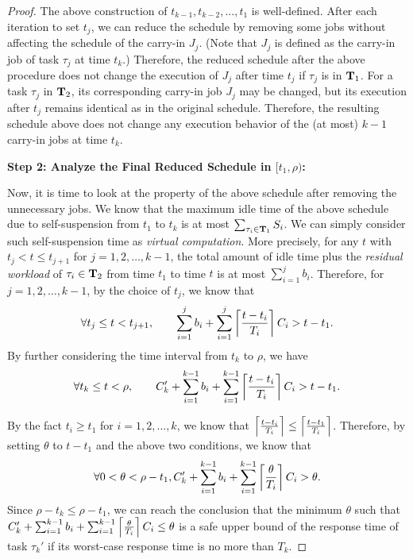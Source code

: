 \begin{proof}
The above construction of $t_{k-1}, t_{k-2}, \ldots, t_1$ is well-defined. After each iteration to set $t_j$, we can reduce the schedule by removing some jobs without affecting the schedule of the carry-in $J_j$. (Note that $J_j$ is defined as the carry-in job of task $\tau_j$ at time $t_k$.) Therefore, the reduced schedule after the above procedure does not change the execution of $J_j$ after time $t_j$ if $\tau_j$ is in ${\bf T}_1$. For a task $\tau_j$ in ${\bf T}_2$, its corresponding carry-in job $J_j$ may be changed, but its execution after $t_j$ remains identical as in the original schedule. 
Therefore, the resulting schedule above does not change any execution behavior of the (at most) $k-1$ carry-in jobs at time $t_k$.

{\bf Step 2: Analyze the Final Reduced Schedule in $[t_1, \rho)$:}


Now, it is time to look at the property of the above schedule after removing the unnecessary jobs. We know that the maximum idle time of the above schedule due to self-suspension from $t_1$ to $t_k$ is at most $\sum_{\tau_i \in {\bf T}_1} S_i$.  We can simply consider such self-suspension time as \emph{virtual computation}.  More precisely, for any $t$ with  $t_j < t \leq t_{j+1}$ for $j=1,2,\ldots,k-1$, the total amount of idle time plus the \emph{residual workload} of $\tau_i \in {\bf T}_2$ from time $t_1$ to time $t$ is at most $\sum_{i=1}^{j} b_i$. 
Therefore, for $j=1,2,\ldots,k-1$, by the choice of $t_j$, we know that
\[
\forall t_j \leq t < t_{j+1},\qquad  \sum_{i=1}^{j} b_i + \sum_{i=1}^j \left\lceil{\frac{t- t_i}{T_i} }\right\rceil C_i >  t-t_1.
\]
By further considering the time interval from $t_k$ to $\rho$, we have
\[
\forall t_k \leq t < \rho,\qquad  C_k'+\sum_{i=1}^{k-1} b_i + \sum_{i=1}^{k-1} \left\lceil{\frac{t- t_i}{T_i} }\right\rceil C_i > t-t_1.
\]

By the fact $t_i \geq t_1$ for $i=1,2,\ldots,k$, we know that $\left\lceil{\frac{t- t_i}{T_i} }\right\rceil \leq \left\lceil{\frac{t- t_1}{T_i} }\right\rceil$. Therefore, by setting $\theta$ to $t-t_1$ and the above two conditions, we know that
\[
\forall 0 < \theta < \rho-t_1 , C_k'+\sum_{i=1}^{k-1} b_i + \sum_{i=1}^{k-1} \left\lceil{\frac{\theta}{T_i} }\right\rceil C_i > \theta.
\]
Since $\rho-t_k \leq \rho-t_1$, we can reach the conclusion that the minimum $\theta$ such that $C_k'+\sum_{i=1}^{k-1} b_i + \sum_{i=1}^{k-1} \left\lceil{\frac{\theta}{T_i} }\right\rceil C_i \leq \theta$ is a safe upper bound of the response time of task $\tau_k'$ if its worst-case response time is no more than $T_k$.
\end{proof}
  
